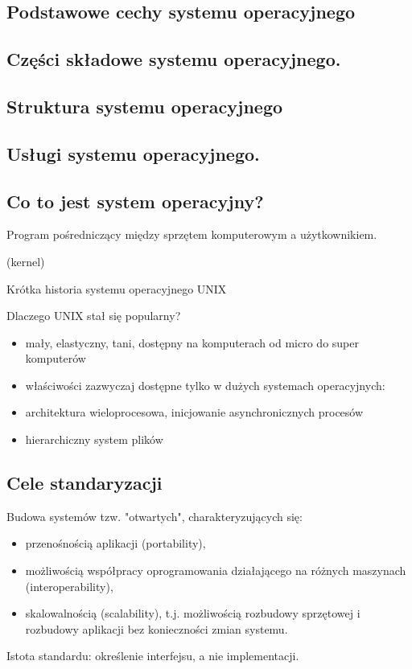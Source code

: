 \documentclass[11pt]{article}
\begin{document}
\subsection{Podstawowe cechy systemu operacyjnego}

\subsection{Części składowe systemu operacyjnego.}

\subsection{Struktura systemu operacyjnego}

\subsection{Usługi systemu operacyjnego.}



\subsection{Co to jest system operacyjny?}
Program pośredniczący między sprzętem komputerowym a użytkownikiem.

(kernel)

Krótka historia systemu operacyjnego UNIX

Dlaczego UNIX stał się popularny?
\begin{itemize}
    \item mały, elastyczny, tani, dostępny na komputerach od micro do super komputerów
    \item właściwości zazwyczaj dostępne tylko w dużych systemach operacyjnych:
    \item architektura wieloprocesowa, inicjowanie asynchronicznych procesów
    \item hierarchiczny system plików
\end{itemize}

\subsection{Cele standaryzacji}
Budowa systemów tzw. "otwartych", charakteryzujących się:
\begin{itemize}
    \item przenośnością aplikacji (portability),
    \item możliwością współpracy oprogramowania działającego na różnych maszynach (interoperability),
    \item skalowalnością (scalability), t.j. możliwością rozbudowy sprzętowej i rozbudowy aplikacji bez
          konieczności zmian systemu.
\end{itemize}
Istota standardu: określenie interfejsu, a nie implementacji.
\end{document}
